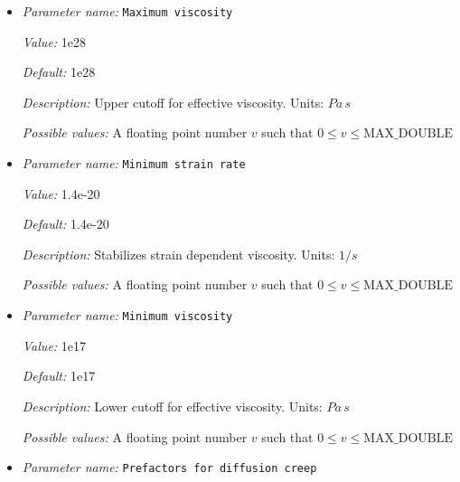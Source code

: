 \begin{itemize}
{\it Value:} 40


{\it Default:} 40


{\it Description:} Maximum number of iterations to find the correct diffusion/dislocation strain rate ratio.


{\it Possible values:} An integer $n$ such that $0\leq n \leq 2147483647$
\item {\it Parameter name:} {\tt Maximum viscosity}
\label{parameters:Material model/Diffusion dislocation/Maximum viscosity}


{\it Value:} 1e28


{\it Default:} 1e28


{\it Description:} Upper cutoff for effective viscosity. Units: $Pa \, s$


{\it Possible values:} A floating point number $v$ such that $0 \leq v \leq \text{MAX\_DOUBLE}$
\item {\it Parameter name:} {\tt Minimum strain rate}
\label{parameters:Material model/Diffusion dislocation/Minimum strain rate}


{\it Value:} 1.4e-20


{\it Default:} 1.4e-20


{\it Description:} Stabilizes strain dependent viscosity. Units: $1 / s$


{\it Possible values:} A floating point number $v$ such that $0 \leq v \leq \text{MAX\_DOUBLE}$
\item {\it Parameter name:} {\tt Minimum viscosity}
\label{parameters:Material model/Diffusion dislocation/Minimum viscosity}


{\it Value:} 1e17


{\it Default:} 1e17


{\it Description:} Lower cutoff for effective viscosity. Units: $Pa \, s$


{\it Possible values:} A floating point number $v$ such that $0 \leq v \leq \text{MAX\_DOUBLE}$
\item {\it Parameter name:} {\tt Prefactors for diffusion creep}
\label{parameters:Material model/Diffusion dislocation/Prefactors for diffusion creep}



\end{itemize}
